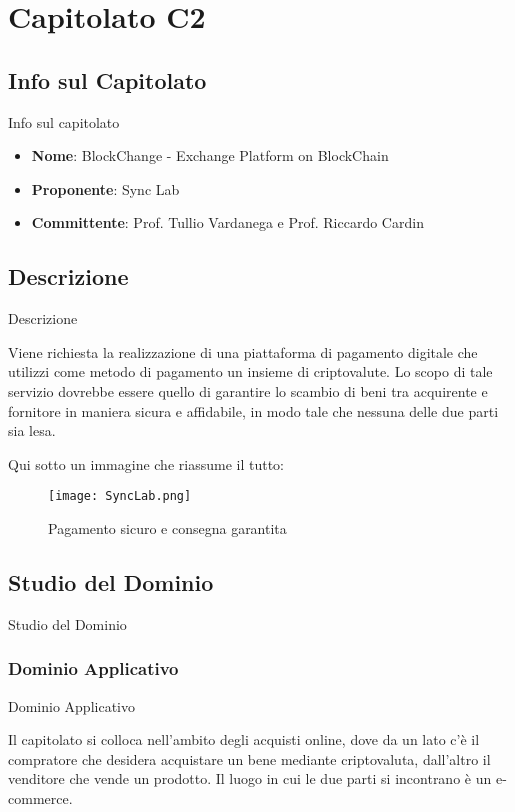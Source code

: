 \documentclass[11pt]{article}
\begin{document}
    \newpage

\section{Capitolato C2}
    \subsection{Info sul Capitolato} Info sul capitolato
    \begin{itemize}
        \item \textbf{Nome}: BlockChange - Exchange Platform on BlockChain
        \item \textbf{Proponente}: Sync Lab
        \item \textbf{Committente}: Prof. Tullio Vardanega e Prof. Riccardo Cardin
    \end{itemize}
    \subsection{Descrizione} Descrizione
    
    Viene richiesta la realizzazione di una piattaforma di pagamento digitale che utilizzi come metodo di pagamento un insieme di criptovalute. Lo scopo di tale servizio dovrebbe essere quello di garantire lo scambio di beni tra acquirente e fornitore in maniera sicura e affidabile, in modo tale che nessuna delle due parti sia lesa.
    
    Qui sotto un immagine che riassume il tutto:
    
    \begin{figure}[h!]
        \centering
        \texttt{[image: SyncLab.png]}
        \caption{Pagamento sicuro e consegna garantita}
        \label{SyncLab}
    \end{figure}
    
    \subsection{Studio del Dominio} Studio del Dominio
        \subsubsection{Dominio Applicativo} Dominio Applicativo
        
        Il capitolato si colloca nell’ambito degli acquisti online, dove da un lato c’è il compratore che desidera acquistare un bene mediante criptovaluta, dall’altro il venditore che vende un prodotto. Il luogo in cui le due parti si incontrano è un e-commerce.
\end{document}
